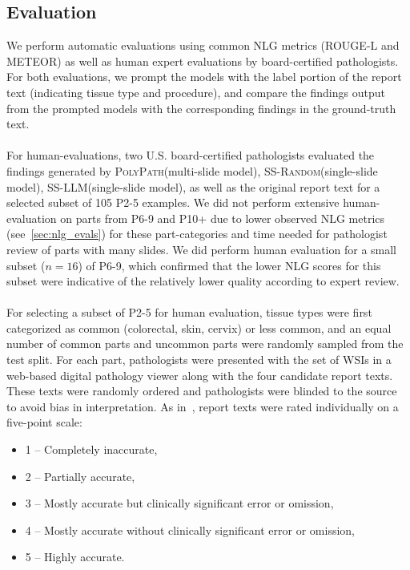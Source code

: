 \documentclass[11pt]{article}
\newcommand{\ourmodel}{\textsc{PolyPath}\xspace}
\newcommand{\randommodel}{\textsc{SS-Random}\xspace}
\newcommand{\llmmodel}{\textsc{SS-LLM}\xspace}
\begin{document}
\subsection{Evaluation}
\label{sec:evaluation}
We perform automatic evaluations using common NLG metrics (ROUGE-L and METEOR) as well as human expert evaluations by board-certified pathologists. For both evaluations, we prompt the models with the label portion of the report text (indicating tissue type and procedure), and compare the findings output from the prompted models with the corresponding findings in the ground-truth text. \\ \\
For human-evaluations, two U.S. board-certified pathologists evaluated the findings generated by \ourmodel (multi-slide model), \randommodel (single-slide model), \llmmodel (single-slide model), as well as the original report text for a selected subset of 105 P2-5 examples. We did not perform extensive human-evaluation on parts from P6-9 and P10+ due to lower observed NLG metrics (see~\autoref{sec:nlg_evals}) for these part-categories and time needed for pathologist review of parts with many slides. We did perform human evaluation for a small subset ($n=16$) of P6-9, which confirmed that the lower NLG scores for this subset were indicative of the relatively lower quality according to expert review. \\ \\
For selecting a subset of P2-5 for human evaluation, tissue types were first categorized as common (colorectal, skin, cervix) or less common, and an equal number of common parts and uncommon parts were randomly sampled from the test split. For each part, pathologists were presented with the set of WSIs in a web-based digital pathology viewer along with the four candidate report texts. These texts were randomly ordered and pathologists were blinded to the source to avoid bias in interpretation. As in~\citet{ahmed2024pathalign}, report texts were rated individually on a five-point scale:
\begin{itemize}
\setlength{\itemsep}{0pt}
    \item 1 -- Completely inaccurate,
    \item 2 -- Partially accurate,
    \item 3 -- Mostly accurate but clinically significant error or omission,
    \item 4 -- Mostly accurate without clinically significant error or omission,
    \item 5 -- Highly accurate.
\end{itemize}
\end{document}
